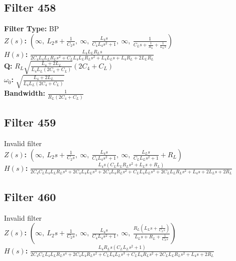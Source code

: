 \documentclass{article}
\begin{document}
\subsection*{Filter 458}
\textbf{Filter Type:} BP \\ 
\textbf{$Z(s)$:} $\left( \infty, \  L_{2} s + \frac{1}{C_{2} s}, \  \infty, \  \frac{L_{4} s}{C_{4} L_{4} s^{2} + 1}, \  \infty, \  \frac{1}{C_{L} s + \frac{1}{R_{L}} + \frac{1}{L_{L} s}}\right)$ \\ 
\textbf{$H(s)$:} $\frac{L_{4} L_{L} R_{L} s}{2 C_{4} L_{4} L_{L} R_{L} s^{2} + C_{L} L_{4} L_{L} R_{L} s^{2} + L_{4} L_{L} s + L_{4} R_{L} + 2 L_{L} R_{L}}$ \\ 
\textbf{Q:} $R_{L} \sqrt{\frac{L_{4} + 2 L_{L}}{L_{4} L_{L} \left(2 C_{4} + C_{L}\right)}} \left(2 C_{4} + C_{L}\right)$ \\ 
\textbf{$\omega_0$:} $\sqrt{\frac{L_{4} + 2 L_{L}}{L_{4} L_{L} \left(2 C_{4} + C_{L}\right)}}$ \\ 
\textbf{Bandwidth:} $\frac{1}{R_{L} \left(2 C_{4} + C_{L}\right)}$ \\ 
\subsection*{Filter 459}
Invalid filter \\ 
\textbf{$Z(s)$:} $\left( \infty, \  L_{2} s + \frac{1}{C_{2} s}, \  \infty, \  \frac{L_{4} s}{C_{4} L_{4} s^{2} + 1}, \  \infty, \  \frac{L_{L} s}{C_{L} L_{L} s^{2} + 1} + R_{L}\right)$ \\ 
\textbf{$H(s)$:} $\frac{L_{4} s \left(C_{L} L_{L} R_{L} s^{2} + L_{L} s + R_{L}\right)}{2 C_{4} C_{L} L_{4} L_{L} R_{L} s^{4} + 2 C_{4} L_{4} L_{L} s^{3} + 2 C_{4} L_{4} R_{L} s^{2} + C_{L} L_{4} L_{L} s^{3} + 2 C_{L} L_{L} R_{L} s^{2} + L_{4} s + 2 L_{L} s + 2 R_{L}}$ \\ 
\subsection*{Filter 460}
Invalid filter \\ 
\textbf{$Z(s)$:} $\left( \infty, \  L_{2} s + \frac{1}{C_{2} s}, \  \infty, \  \frac{L_{4} s}{C_{4} L_{4} s^{2} + 1}, \  \infty, \  \frac{R_{L} \left(L_{L} s + \frac{1}{C_{L} s}\right)}{L_{L} s + R_{L} + \frac{1}{C_{L} s}}\right)$ \\ 
\textbf{$H(s)$:} $\frac{L_{4} R_{L} s \left(C_{L} L_{L} s^{2} + 1\right)}{2 C_{4} C_{L} L_{4} L_{L} R_{L} s^{4} + 2 C_{4} L_{4} R_{L} s^{2} + C_{L} L_{4} L_{L} s^{3} + C_{L} L_{4} R_{L} s^{2} + 2 C_{L} L_{L} R_{L} s^{2} + L_{4} s + 2 R_{L}}$ \\ 
\end{document}
